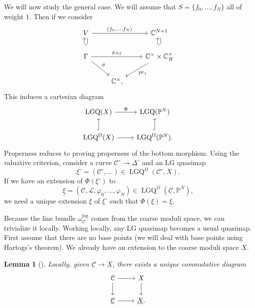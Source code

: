 \documentclass[10pt]{amsart}
\newtheorem{lem}[thm]{Lemma}
\theoremstyle{definition}
\theoremstyle{remark}
\theoremstyle{plain}
\theoremstyle{definition}
\theoremstyle{remark}
\newcommand{\C}{\mathbb{C}}
\renewcommand{\P}{\mathbb{P}}
\newcommand{\ep}{\varepsilon}
\newcommand{\mc}[1]{\mathcal{#1}}
\newcommand{\mr}[1]{\mathrm{#1}}
\newcommand{\on}[1]{\operatorname{#1}}
\newcommand{\ul}[1]{\underline{#1}}
\newcommand{\1}{\mathbf{1}}
\newcommand{\2}{\mathbf{2}}
\newcommand{\3}{\mathbf{3}}
\begin{document}
We will now study the general case. We will assume that $S = \{f_0, \ldots, f_N \}$ all of weight $1$. Then if we consider
\begin{equation*}
\begin{tikzcd}
    V \ar{rr}{(f_0, \ldots, f_N)} \ar[loop below] & & \C^{N+1} \ar[loop below] \\
    \Gamma \ar{rr}{\vartheta \times \ep} \ar{dr}{\vartheta} & & \C^{\times} \times \C^{\times}_R \ar{dl}{\mr{pr}_1} \\
    & \C^{\times},
\end{tikzcd}
\end{equation*}
This induces a cartesian diagram
\begin{equation*}
\begin{tikzcd}
    \on{LGQ}(X) \ar{r}{\Phi} & \on{LGQ}(\P^N) \\
    \on{LGQ}^{\Omega}(X) \ar{r} \ar[hookrightarrow]{u} & \on{LGQ}^{\Omega}(\P^N)\ar[hookrightarrow]{u}.
\end{tikzcd}
\end{equation*}
Properness reduces to proving properness of the bottom morphism. Using the valuative criterion, consider a curve $\mc{C}^{\circ} \to \Delta^{\circ}$ and an LG quasimap
\[\xi^{\circ} = (\mc{C}^{\circ},\ldots) \in \on{LGQ}^{\Omega}(\mc{C}^{\circ}, X). \]
If we have an extension of $\Phi(\xi^{\circ})$ to
\[ \ul{ \xi } = (\mc{C}, \mc{L}, \varphi_0, \ldots, \varphi_N) \in \on{LGQ}^{\Omega}(\ul{ \mc{C} }, \P^N), \]
we need a unique extension $\xi$ of $\xi^{\circ}$ such that $\Phi(\xi) = \ul{\xi}$.

Because the line bundle $\omega_{\mc{C}}^{\log}$ comes from the coarse moduli space, we can trivialize it locally. Working locally, any LG quasimap becomes a usual quasimap. First assume that there are no base points (we will deal with base points using Hartogs's theorem). We already have an extension to the coarse moduli space $\ul{X}$.

\begin{lem}[\cite{av}]
    Locally, given $\ul{\mc{C}} \to \ul{X}$, there exists a unique commutative diagram
    \begin{equation*}
    \begin{tikzcd}
        \mc{C} \ar{r} \ar{d} & X \ar{d} \\
        \ul{\mc{C}} \ar{r} & \ul{X}.
    \end{tikzcd}
    \end{equation*}
\end{lem}
\end{document}
